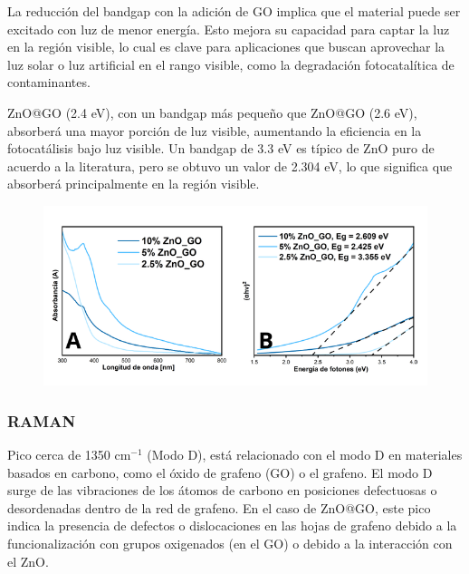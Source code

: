 \documentclass[12pt]{article}
\begin{document}
La reducción del bandgap con la adición de GO implica que el material puede ser excitado con luz de menor energía. Esto mejora su capacidad para captar la luz en la región visible, lo cual es clave para aplicaciones que buscan aprovechar la luz solar o luz artificial en el rango visible, como la degradación fotocatalítica de contaminantes.\vspace{1em} %

ZnO@GO (2.4 eV), con un bandgap más pequeño que ZnO@GO (2.6 eV), absorberá una mayor porción de luz visible, aumentando la eficiencia en la fotocatálisis bajo luz visible. Un bandgap de 3.3 eV es típico de ZnO puro de acuerdo a la literatura, pero se obtuvo un valor de 2.304 eV, lo que significa que absorberá principalmente en la región visible.



 \begin{figure}[H]
    	   \begin{center}
     	  	\includegraphics[width = 1\textwidth]{Imagenes/UV_BandG_ZnOGO.png}
    	   \end{center} 
        \end{figure}


 \subsubsection{RAMAN}

Pico cerca de 1350 cm$\displaystyle ^{-1}$ (Modo D), está relacionado con el modo D en materiales basados en carbono, como el óxido de grafeno (GO) o el grafeno. El modo D surge de las vibraciones de los átomos de carbono en posiciones defectuosas o desordenadas dentro de la red de grafeno.
En el caso de ZnO@GO, este pico indica la presencia de defectos o dislocaciones en las hojas de grafeno debido a la funcionalización con grupos oxigenados (en el GO) o debido a la interacción con el ZnO.\vspace{1em} %
\end{document}
